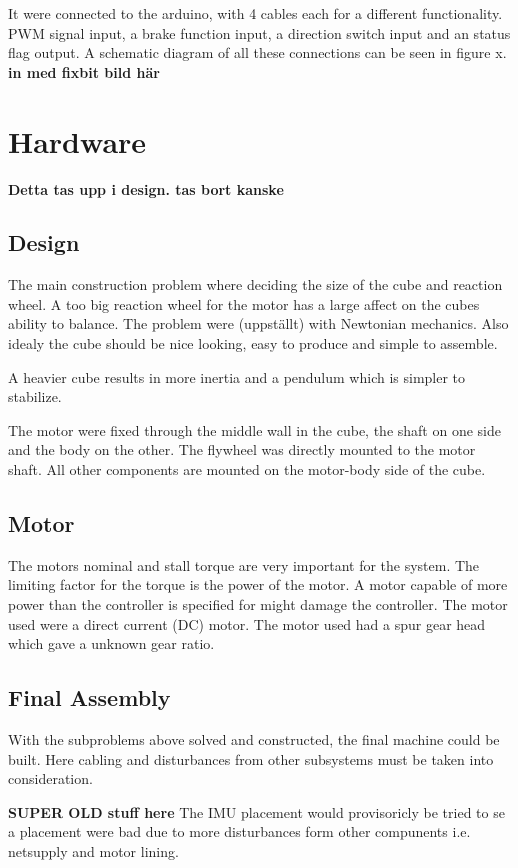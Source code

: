 \documentclass[a4paper,11pt]{kth-mag}
\begin{document}
It were connected to the arduino, with 4 cables each for a different functionality. PWM signal input, a brake function input, a direction switch input and an status flag output. A schematic diagram of all these connections can be seen in figure x.
\textbf{in med fixbit bild här}
\section{Hardware}
\textbf{Detta tas upp i design. tas bort kanske}

\subsection{Design}
The main construction problem where deciding the size of the cube and reaction wheel. A too big reaction wheel for the motor has a large affect on the cubes ability to balance. The problem were (uppställt) with Newtonian mechanics.
Also idealy the cube should be nice looking, easy to produce and simple to assemble. 

A heavier cube results in more inertia and a pendulum which is simpler to stabilize.

The motor were fixed through the middle wall in the cube, the shaft on one side and the body on the other. The flywheel was directly mounted to the motor shaft. All other components are mounted on the motor-body side of the cube.
 
\subsection{Motor}
The motors nominal and stall torque are very important for the system. The limiting factor for the torque is the power of the motor. A motor capable of more power than the controller is specified for might damage the controller. The motor used were a direct current (DC) motor. 
The motor used had a spur gear head which gave a unknown gear ratio.

\subsection{Final Assembly}
With the subproblems above solved and constructed, the final machine could be built. Here cabling and disturbances from other subsystems must be taken into consideration. 

\textbf{SUPER OLD stuff here}
The IMU placement would provisoricly be tried to se a placement were bad due to more disturbances form other compunents i.e. netsupply and motor lining.
\end{document}
